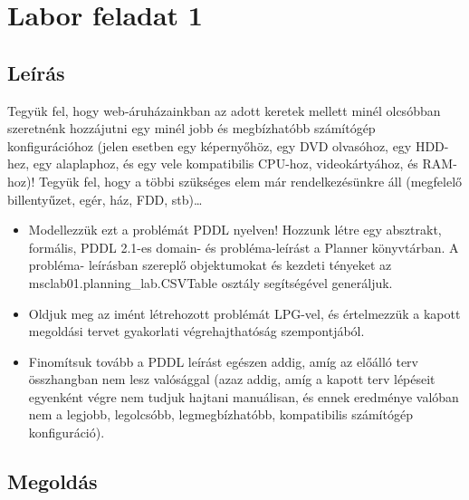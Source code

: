 \section{Labor feladat 1}
\subsection{Leírás}
Tegyük fel, hogy web-áruházainkban az adott keretek mellett minél olcsóbban szeretnénk hozzájutni egy minél jobb és megbízhatóbb számítógép konfigurációhoz (jelen esetben egy képernyőhöz, egy DVD olvasóhoz, egy HDD-hez, egy alaplaphoz, és egy vele kompatibilis CPU-hoz, videokártyához, és RAM-hoz)! Tegyük fel, hogy a többi szükséges elem már rendelkezésünkre áll (megfelelő billentyűzet, egér, ház, FDD, stb)… 
\begin{itemize}
\item Modellezzük ezt a problémát PDDL nyelven! Hozzunk létre egy absztrakt, formális, PDDL 2.1-es domain- és probléma-leírást a Planner könyvtárban. A probléma- leírásban szereplő objektumokat és kezdeti tényeket az msclab01.planning\_lab.CSVTable osztály segítségével generáljuk. 
\item Oldjuk meg az imént létrehozott problémát LPG-vel, és értelmezzük a kapott megoldási tervet gyakorlati végrehajthatóság szempontjából. 
\item Finomítsuk tovább a PDDL leírást egészen addig, amíg az előálló terv összhangban nem lesz valósággal (azaz addig, amíg a kapott terv lépéseit egyenként végre nem tudjuk hajtani manuálisan, és ennek eredménye valóban nem a legjobb, legolcsóbb, legmegbízhatóbb, kompatibilis számítógép konfiguráció). 
\end{itemize}
\subsection{Megoldás}
